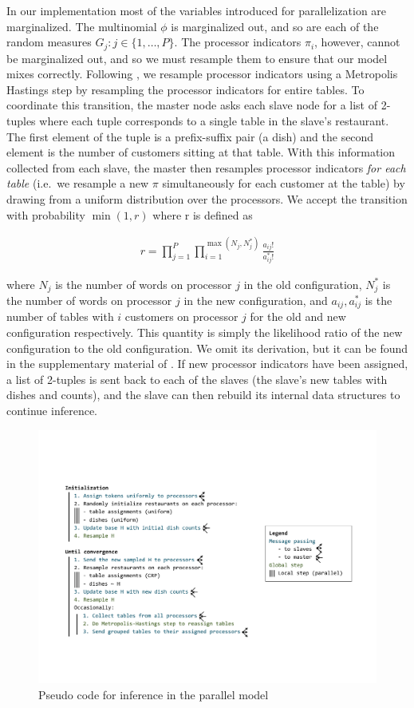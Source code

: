 In our implementation most of the variables introduced for
parallelization are marginalized. The multinomial $\phi$ is
marginalized out, and so are each of the random measures $G_j : j \in
\{1, \ldots, P\}$. The processor indicators $\pi_i$, however, cannot
be marginalized out, and so we must resample them to ensure that our
model mixes correctly. Following \cite{williamson2013}, we resample
processor indicators using a Metropolis Hastings step by resampling
the processor indicators for entire tables. To coordinate this
transition, the master node asks each slave node for a list of
2-tuples where each tuple corresponds to a single table in the slave's
restaurant. The first element of the tuple is a prefix-suffix pair (a
dish) and the second element is the number of customers sitting at
that table. With this information collected from each slave, the
master then resamples processor indicators \textit{for each table}
(i.e.~we resample a new $\pi$ simultaneously for each customer at the
table) by drawing from a uniform distribution over the processors. We
accept the transition with probability $\min(1, r)$ where r is defined
as

\begin{align}
  r = \prod_{j = 1}^P \prod_{i=1}^{\max(N_j, N_j^*)} \frac{a_{ij}!}{a_{ij}^*!}
\end{align}

where $N_j$ is the number of words on processor $j$ in the old
configuration, $N_j^*$ is the number of words on processor $j$ in the
new configuration, and $a_{ij}, a_{ij}^*$ is the number of tables with
$i$ customers on processor $j$ for the old and new configuration
respectively. This quantity is simply the likelihood ratio of the new
configuration to the old configuration. We omit its derivation, but it
can be found in the supplementary material of
\cite{williamson2013}. If new processor indicators have been assigned,
a list of 2-tuples is sent back to each of the slaves (the slave's new
tables with dishes and counts), and the slave can then rebuild its
internal data structures to continue inference.

\begin{figure}[h]
  \centering
  \includegraphics[width=1.05\textwidth]{fig/parallel_code_schema}
  \caption{Pseudo code for inference in the parallel model}
  \label{fig:inference}
\end{figure}
